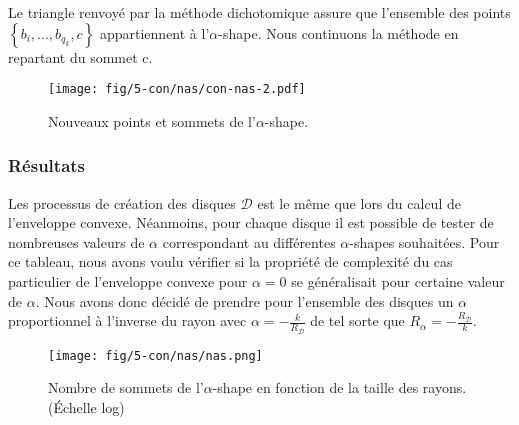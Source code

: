 Le triangle renvoyé par la méthode dichotomique assure que l'ensemble des points $\left\{ b_{i},\ldots, b_{q_k}, c \right\}$ appartiennent à l'$\alpha$-shape. Nous continuons la méthode en repartant du sommet c.
 
\begin{figure}[H]
  \centering
  \texttt{[image: fig/5-con/nas/con-nas-2.pdf]}
  \caption{Nouveaux points et sommets de l'$\alpha$-shape.}
\end{figure}


\subsubsection{Résultats}

Les processus de création des disques $\mathcal{D}$ est le même que lors du calcul de l'enveloppe convexe. Néanmoins, pour chaque disque il est possible de tester de nombreuses valeurs de $\alpha$ correspondant au différentes $\alpha$-shapes souhaitées. Pour ce tableau, nous avons voulu vérifier si la propriété de complexité du cas particulier de l'enveloppe convexe pour $\alpha = 0$ se généralisait pour certaine valeur de $\alpha$. Nous avons donc décidé de prendre pour l'ensemble des disques un $\alpha$ proportionnel à l'inverse du rayon avec $\alpha = -\frac{k}{R_{\mathcal{D}}}$ de tel sorte que $R_{\alpha} = -\frac{R_{\mathcal{D}}}{k}$.
 

\begin{figure}[H]
  \centering
  \texttt{[image: fig/5-con/nas/nas.png]}
  \caption{Nombre de sommets de l'$\alpha$-shape en fonction de la taille des rayons. (Échelle log)}
\end{figure}


